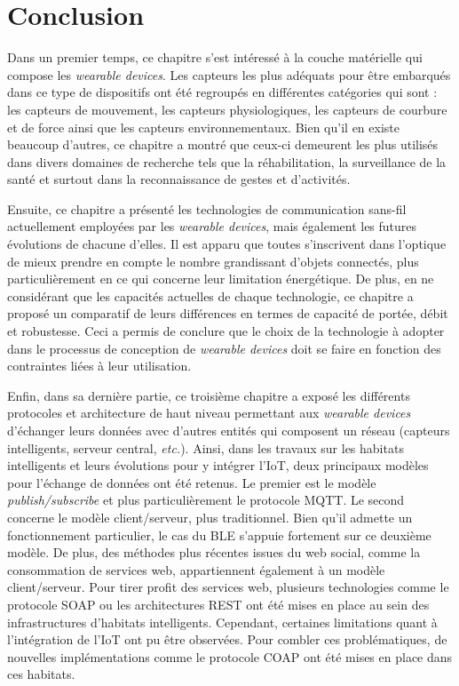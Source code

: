 \section{Conclusion}

Dans un premier temps, ce chapitre s'est intéressé à la couche matérielle qui compose les \textit{wearable devices}. Les capteurs les plus adéquats pour être embarqués dans ce type de dispositifs ont été regroupés en différentes catégories qui sont : les capteurs de mouvement, les capteurs physiologiques, les capteurs de courbure et de force ainsi que les capteurs environnementaux. Bien qu'il en existe beaucoup d'autres, ce chapitre a montré que ceux-ci demeurent les plus utilisés dans divers domaines de recherche tels que la réhabilitation, la surveillance de la santé et surtout dans la reconnaissance de gestes et d'activités.

Ensuite, ce chapitre a présenté les technologies de communication sans-fil actuellement employées par les \textit{wearable devices}, mais également les futures évolutions de chacune d'elles. Il est apparu que toutes s'inscrivent dans l'optique de mieux prendre en compte le nombre grandissant d'objets connectés, plus particulièrement en ce qui concerne leur limitation énergétique. De plus, en ne considérant que les capacités actuelles de chaque technologie, ce chapitre a proposé un comparatif de leurs différences en termes de capacité de portée, débit et robustesse. Ceci a permis de conclure que le choix de la technologie à adopter dans le processus de conception de \textit{wearable devices} doit se faire en fonction des contraintes liées à leur utilisation.

Enfin, dans sa dernière partie, ce troisième chapitre a exposé les différents protocoles et architecture de haut niveau permettant aux \textit{wearable devices} d'échanger leurs données avec d'autres entités qui composent un réseau (capteurs intelligents, serveur central, \textit{etc.}). Ainsi, dans les travaux sur les habitats intelligents et leurs évolutions pour y intégrer l'\acs{IoT}, deux principaux modèles pour l'échange de données ont été retenus. Le premier est le modèle \textit{publish/subscribe} et plus particulièrement le protocole \acs{MQTT}. Le second concerne le modèle client/serveur, plus traditionnel. Bien qu'il admette un fonctionnement particulier, le cas du \acs{BLE} s'appuie fortement sur ce deuxième modèle. De plus, des méthodes plus récentes issues du web social, comme la consommation de services web, appartiennent également à un modèle client/serveur. Pour tirer profit des services web, plusieurs technologies comme le protocole \acs{SOAP} ou les architectures \acs{REST} ont été mises en place au sein des infrastructures d'habitats intelligents. Cependant, certaines limitations quant à l'intégration de l'\acs{IoT} ont pu être observées. Pour combler ces problématiques, de nouvelles implémentations comme le protocole \acs{COAP} ont été mises en place dans ces habitats.